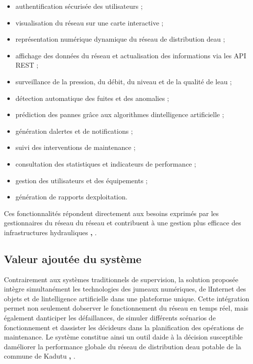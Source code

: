 \begin{itemize}
	\item
	authentification sécurisée des utilisateurs ;
	\item
	visualisation du réseau sur une carte interactive ;
	\item
	représentation numérique dynamique du réseau de distribution
	d\textquotesingle eau ;
	\item
	affichage des données du réseau et actualisation des informations via
	les API REST ;
	\item
	surveillance de la pression, du débit, du niveau et de la qualité de
	l\textquotesingle eau ;
	\item
	détection automatique des fuites et des anomalies ;
	\item
	prédiction des pannes grâce aux algorithmes
	d\textquotesingle intelligence artificielle ;
	\item
	génération d\textquotesingle alertes et de notifications ;
	\item
	suivi des interventions de maintenance ;
	\item
	consultation des statistiques et indicateurs de performance ;
	\item
	gestion des utilisateurs et des équipements ;
	\item
	génération de rapports d\textquotesingle exploitation.
\end{itemize}

Ces fonctionnalités répondent directement aux besoins exprimés par les
gestionnaires du réseau du réseau et contribuent à une gestion plus efficace des
infrastructures hydrauliques \cite{ref106}\textbf{,} \cite{ref20}.

\subsection{Valeur ajoutée du système}\label{valeur-ajoutuxe9e-du-systuxe8me}

Contrairement aux systèmes traditionnels de supervision, la solution
proposée intègre simultanément les technologies des jumeaux numériques,
de l\textquotesingle Internet des objets et de
l\textquotesingle intelligence artificielle dans une plateforme unique.
Cette intégration permet non seulement d\textquotesingle observer le
fonctionnement du réseau en temps réel, mais également
d\textquotesingle anticiper les défaillances, de simuler différents
scénarios de fonctionnement et d\textquotesingle assister les décideurs
dans la planification des opérations de maintenance. Le système
constitue ainsi un outil d\textquotesingle aide à la décision
susceptible d\textquotesingle améliorer la performance globale du réseau
de distribution d\textquotesingle eau potable de la commune de Kadutu
\cite{ref17}\textbf{,} \cite{ref114}.

